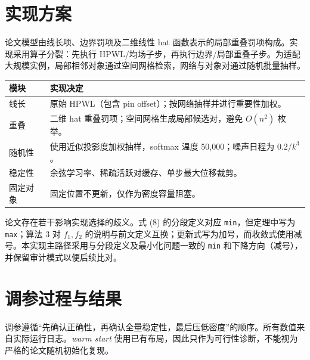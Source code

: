 \documentclass[11pt,a4paper]{ctexart}
\newcommand{\HPWL}{\textsc{HPWL}}
\begin{document}
\section{实现方案}

论文模型由线长项、边界罚项及二维线性 hat 函数表示的局部重叠罚项构成。实现采用算子分裂：先执行 \HPWL{}/均场子步，再执行边界/局部重叠子步。为适配大规模实例，局部相邻对象通过空间网格检索，网络与对象对通过随机批量抽样。

\begin{center}
\begin{tabular}{p{3cm}p{8.8cm}}
\toprule
模块 & 实现决定 \\
\midrule
线长 & 原始 \HPWL{}（包含 pin offset）；按网络抽样并进行重要性加权。\\
重叠 & 二维 hat 重叠罚项；空间网格生成局部候选对，避免 $O(n^2)$ 枚举。\\
随机性 & 使用近似投影度加权抽样，softmax 温度 50,000；噪声日程为 $0.2/k^3$。\\
稳定性 & 余弦学习率、稀疏活跃对缓存、单步最大位移裁剪。\\
固定对象 & 固定位置不更新，仅作为密度容量阻塞。\\
\bottomrule
\end{tabular}
\end{center}

论文存在若干影响实现选择的歧义。式 (8) 的分段定义对应 \texttt{min}，但定理中写为 \texttt{max}；算法 3 对 $f_1,f_2$ 的说明与前文定义互换；更新式写为加号，而收敛式使用减号。本实现主路径采用与分段定义及最小化问题一致的 \texttt{min} 和下降方向（减号），并保留审计模式以便后续比对。

\section{调参过程与结果}

调参遵循“先确认正确性，再确认全量稳定性，最后压低密度”的顺序。所有数值来自实际运行日志。\textit{warm start} 使用已有布局，因此只作为可行性诊断，不能视为严格的论文随机初始化复现。
\end{document}
